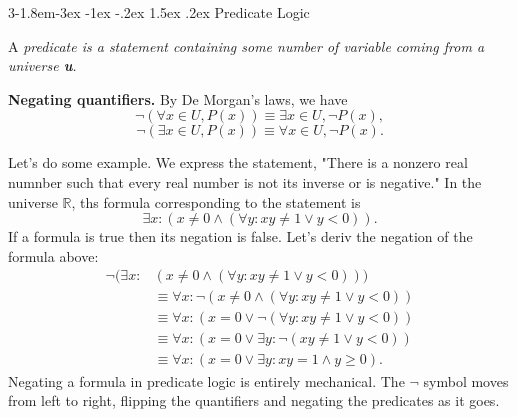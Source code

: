 \documentclass{tufte-handout}
\makeatletter
\renewcommand{\subsection}{\@startsection{subsection}%
    {3}{-1.8em}{-3ex \@plus -1ex \@minus -.2ex}%
    {1.5ex \@plus .2ex}
    {\hspace*{-5.5em}\fcolorbox{ltblue}{ltblue}{\parbox[c][1.0ex][b]{4em}{\phantom{space}}}
    \normalfont\large\itshape\color{ltblue}}}
\makeatother
\begin{document}

\subsection{Predicate Logic}
    \begin{Definition}[Predicate]
    A \it predicate \rm is a statement containing some number
    of variable coming from a universe \textbf{u}. 
    \end{Definition}

\textbf{Negating quantifiers.} By De Morgan's laws, we have
\[\neg (\forall x \in U, P(x)) \equiv \exists x \in U, \neg P(x),\]
\[\neg (\exists x \in U, P(x)) \equiv \forall x \in U, \neg P(x).\]

Let's do some example. We express the statement, "There is a nonzero real numnber such that
every real number is not its inverse or is negative." In the universe \( \mathbb{R} \), ths formula corresponding
to the statement is
\[\exists x: (x\neq 0 \wedge (\forall y: xy \neq 1 \vee y < 0)).\]
If a formula is true then its negation is false. Let's deriv the negation of the formula above:
\begin{align*}
    \neg (\exists x: &(x\neq 0 \wedge (\forall y: xy \neq 1 \vee y < 0))) \\
    &\equiv \forall x: \neg (x\neq 0 \wedge (\forall y: xy \neq 1 \vee y < 0)) \\
    &\equiv \forall x: (x = 0 \vee \neg (\forall y: xy \neq 1 \vee y < 0)) \\
    &\equiv \forall x: (x = 0 \vee \exists y: \neg (xy \neq 1 \vee y < 0)) \\
    &\equiv \forall x: (x = 0 \vee \exists y: xy = 1 \wedge y \geq 0).
\end{align*}
Negating a formula in predicate logic is entirely mechanical. The \( \neg \) symbol
moves from left to right, flipping the quantifiers and negating the predicates as it goes.
\end{document}
